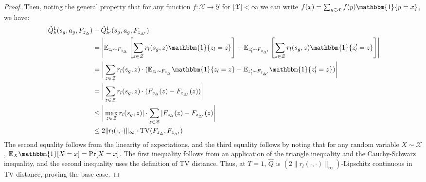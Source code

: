 \documentclass{article}
\theoremstyle{plain}
\theoremstyle{definition}
\def\E{\mathbb{E}}
\begin{document}
\begin{proof}
Then, noting the general property that for any function $f:\mathcal{X}\to\mathcal{Y}$ for $|\mathcal{X}|<\infty$ we can write $f(x) = \sum_{y\in\mathcal{X}}f(y)\mathbbm{1}\{y=x\}$, we have: 
\begin{align*}
|\hat{Q}^1_k(s_g,a_g,F_{z_\Delta}) &- \hat{Q}_{k'}^1(s_g, a_g,F_{z_{\Delta'}})| \\
&= \left|\E_{z_l \sim F_{z_\Delta}}\left[\sum_{z\in \mathcal{Z}}r_l(s_g, z)\mathbbm{1}\{z_l = z\}\right] - \E_{z_l' \sim F_{z_{\Delta'}}}\left[\sum_{z\in\mathcal{Z}}r_l(s_g, z)\mathbbm{1}\{z_l' = z\}\right]\right| \\
&= \bigg|\sum_{z\in\mathcal{Z}}r_l(s_g,z)\cdot (\E_{z_l\sim F_{z_\Delta}}\mathbbm{1}\{z_l=z\} - \E_{z_l'\sim F_{z_{\Delta'}}}\mathbbm{1}\{z_l'=z\})\bigg| \\
&= \bigg|\sum_{z\in\mathcal{Z}}r_l(s_g,z)\cdot (F_{z_\Delta}(z) - F_{z_{\Delta'}}(z))\bigg|\\
&\leq \bigg|\max_{z\in\mathcal{Z}}r_l(s_g,z)|\cdot \sum_{z\in\mathcal{Z}}|F_{z_\Delta}(z) - F_{z_{\Delta'}}(z)\bigg| \\
&\leq 2\|r_l(\cdot,\cdot)\|_\infty \cdot \mathrm{TV}(F_{z_\Delta}, F_{z_{\Delta'}}) 
\end{align*}
The second equality follows from the linearity of expectations, and the third equality follows by noting that for any random variable $X\sim\mathcal{X}$, $\E_X\mathbbm{1}[X=x]=\Pr[X=x]$.
The first inequality follows from an application of the triangle inequality and the Cauchy-Schwarz inequality, and the second inequality uses the definition of TV distance. Thus, at $T=1$, $\hat{Q}$ is $(2\|r_l(\cdot,\cdot)\|_\infty)$-Lipschitz continuous in TV distance, proving the base case.


\end{proof}
\end{document}
